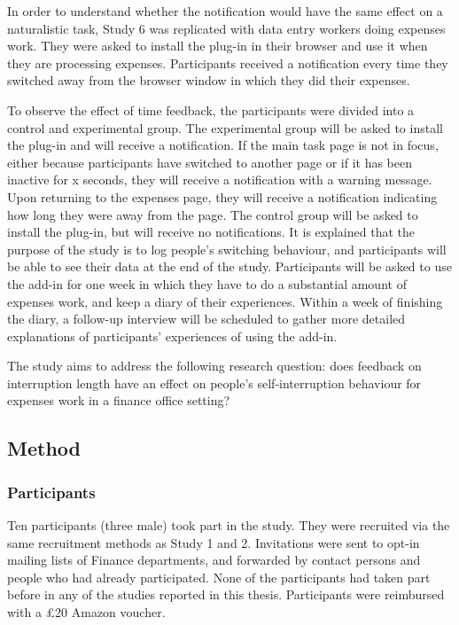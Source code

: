 In order to understand whether the notification would have the same effect on a naturalistic task, Study 6 was replicated with data entry workers doing expenses work. They were asked to install the plug-in in their browser and use it when they are processing expenses. Participants received a notification every time they switched away from the browser window in which they did their expenses.

To observe the effect of time feedback, the participants were divided into a control and experimental group. 
The experimental group will be asked to install the plug-in and will receive a notification. If the main task page is not in focus, either because participants have switched to another page or if it has been inactive for x seconds, they will receive a notification with a warning message. Upon returning to the expenses page, they will receive a notification indicating how long they were away from the page. The control group will be asked to install the plug-in, but will receive no notifications. It is explained that the purpose of the study is to log people's switching behaviour, and participants will be able to see their data at the end of the study.
Participants will be asked to use the add-in for one week in which they have to do a substantial amount of expenses work, and keep a diary of their experiences. Within a week of finishing the diary, a follow-up interview will be scheduled to gather more detailed explanations of participants' experiences of using the add-in.

The study aims to address the following research question: does feedback on interruption length have an effect on people's self-interruption behaviour for expenses work in a finance office setting? 

\subsection{Method}
\subsubsection{Participants}
Ten participants (three male) took part in the study. They were recruited via the same recruitment methods as Study 1 and 2. Invitations were sent to opt-in mailing lists of Finance departments, and forwarded by contact persons and people who had already participated. None of the participants had taken part before in any of the studies reported in this thesis.
Participants were reimbursed with a \pounds 20 Amazon voucher.

